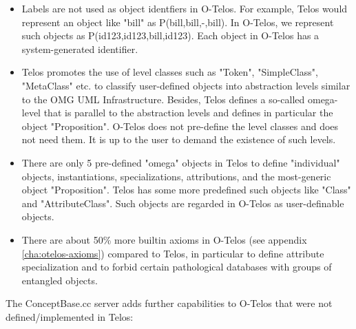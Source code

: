 \begin{itemize}
\item Labels are not used as object identfiers in O-Telos. For example, Telos would represent an
object like "bill" as P(bill,bill,-,bill). In O-Telos, we represent such objects as
P(id123,id123,bill,id123). Each object in O-Telos has a system-generated identifier.
\item Telos promotes the use of level classes such as "Token", "SimpleClass", "MetaClass" etc. to
classify user-defined objects into abstraction levels similar to the OMG UML Infrastructure. Besides,
Telos defines a so-called omega-level that is parallel to the abstraction levels and defines
in particular the object "Proposition". O-Telos does not pre-define the level classes and does not
need them. It is up to the user to demand the existence of such levels.
\item There are only 5 pre-defined "omega" objects in Telos to define "individual" objects, instantiations,
specializations, attributions, and the most-generic object "Proposition". Telos has some more
predefined such objects like "Class" and "AttributeClass". Such objects are regarded in O-Telos as
user-definable objects.
\item There are about 50\% more builtin axioms in O-Telos (see appendix \ref{cha:otelos-axioms})
compared to Telos, in particular to define
attribute specialization and to forbid certain pathological databases with groups of entangled
objects.
\end{itemize}

The ConceptBase.cc server adds further capabilities to O-Telos that were not defined/implemented
in Telos:

